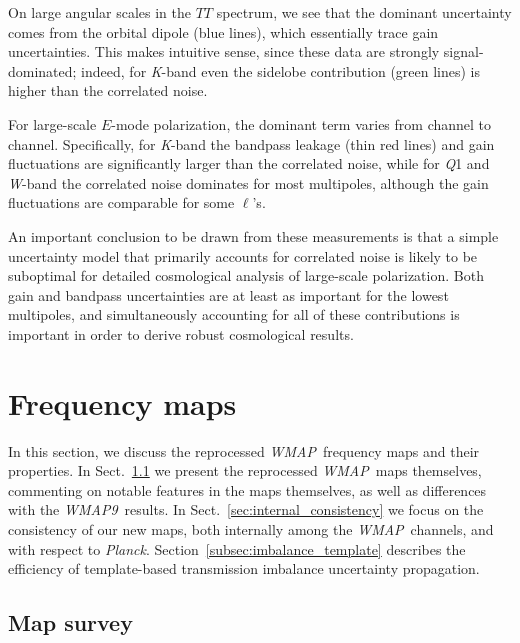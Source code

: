 \documentclass[twocolumn]{../../common/aa}
\def\WMAP{\emph{WMAP}}
\def\WMAPnine{\emph{WMAP9}}
\def\Planck{\emph{Planck}}
\newcommand{\K}[0]{\textit K}
\newcommand{\Q}[0]{\textit Q}
\newcommand{\W}[0]{\textit W}
\begin{document}
On large angular scales in the $TT$ spectrum, we see that the dominant uncertainty comes from the orbital dipole (blue lines), which essentially trace gain uncertainties. This makes intuitive sense, since these data are strongly signal-dominated; indeed, for \K-band even the sidelobe contribution (green lines) is higher than the correlated noise.

For large-scale $E$-mode polarization, the dominant term varies from channel to channel. Specifically, for \K-band the bandpass leakage (thin red lines) and gain fluctuations are significantly larger than the correlated noise, while for \Q1 and \W-band the correlated noise dominates for most multipoles, although the gain fluctuations are comparable for some $\ell$'s.

An important conclusion to be drawn from these measurements is that a simple uncertainty model that primarily accounts for correlated noise is likely to be suboptimal for detailed cosmological analysis of large-scale polarization. Both gain and bandpass uncertainties are at least as important for the lowest multipoles, and simultaneously accounting for all of these contributions is important in order to derive robust cosmological results.






\section{Frequency maps}
\label{sec:maps}

In this section, we discuss the reprocessed \WMAP\ frequency maps and their properties. In Sect.~\ref{ssec:means} we present the reprocessed \WMAP\ maps themselves, commenting on notable features in the maps themselves, as well as differences with the \WMAPnine\ results. In Sect.~\ref{sec:internal_consistency} we focus on the consistency of our new maps, both internally among the \WMAP\ channels, and with respect to \Planck. Section~\ref{subsec:imbalance_template} describes the efficiency of template-based transmission imbalance uncertainty propagation.

\subsection{Map survey}
\label{ssec:means}
\end{document}
